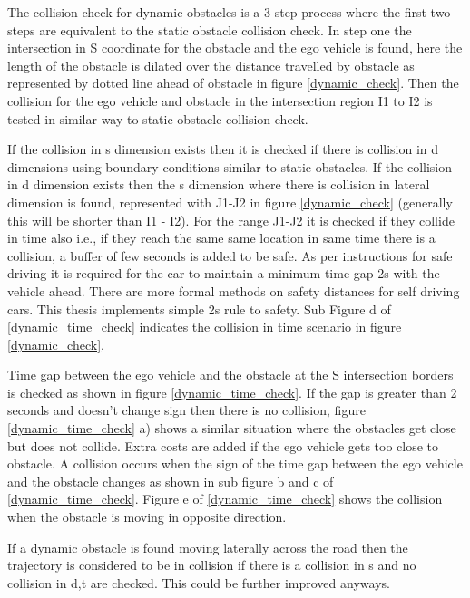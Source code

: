 The collision check for dynamic obstacles is a 3 step process where the first two steps are equivalent to the static obstacle collision check. In step one the intersection in S coordinate for the obstacle and the ego vehicle is found, here the length of the obstacle is dilated over the distance travelled by obstacle as represented by dotted line ahead of obstacle in figure \ref{dynamic_check}. Then the collision for the ego vehicle and obstacle in the intersection region I1 to I2 is tested in similar way to static obstacle collision check. 

If the collision in s dimension exists then it is checked if there is collision in d dimensions using boundary conditions similar to static obstacles. If the collision in d dimension exists then the s dimension where there is collision in lateral dimension is found, represented with J1-J2 in figure \ref{dynamic_check} (generally this will be shorter than I1 - I2). For the range J1-J2 it is checked if they collide in time also i.e., if they reach the same same location in same time there is a collision, a buffer of few seconds is added to be safe. As per instructions for safe driving it is required for the car to maintain a minimum time gap 2s with the vehicle ahead. There are more formal methods \cite{mobile_eye_safety_distance} on safety distances for self driving cars. This thesis implements simple 2s rule to safety. Sub Figure d of \ref{dynamic_time_check} indicates the collision in time scenario in figure \ref{dynamic_check}.

Time gap between the ego vehicle and the obstacle at the S intersection borders is checked as shown in figure \ref{dynamic_time_check}. If the gap is greater than 2 seconds and doesn't change sign then there is no collision, figure \ref{dynamic_time_check} a) shows a similar situation where the obstacles get close but does not collide. Extra costs are added if the ego vehicle gets too close to obstacle. A collision occurs when the sign of the time gap between the ego vehicle and the obstacle changes as shown in sub figure b and c of \ref{dynamic_time_check}. Figure e of \ref{dynamic_time_check} shows the collision when the obstacle is moving in opposite direction. 

If a dynamic obstacle is found moving laterally across the road then the trajectory is considered to be in collision if there is a collision in s and no collision in d,t are checked. This could be further improved anyways.  



